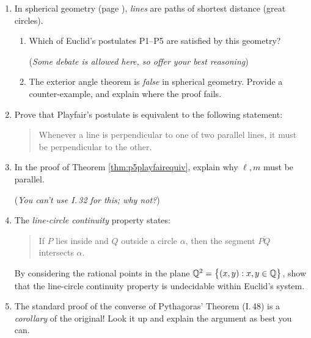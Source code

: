 \begin{exercises}
\begin{enumerate}
	  
	  \item In spherical geometry (page \pageref{pg:sphere}), \emph{lines} are paths of shortest distance (great circles).
	 	\begin{enumerate}
	 	  \item Which of Euclid's postulates P1--P5 are satisfied by this geometry?\par
	 	  (\emph{Some debate is allowed here, so offer your best reasoning})
	 	  
	  	\item The exterior angle theorem is \emph{false} in spherical geometry. Provide a counter-example, and explain where the proof fails. 
	 	\end{enumerate}
	  
	  
	  \item Prove that Playfair's postulate is equivalent to the following statement:
	 	\begin{quote}
	  	Whenever a line is perpendicular to one of two parallel lines, it must be perpendicular to the other.
	  \end{quote}
	  
	  
	  \item\label{exs:playfairlparallellemma} In the proof of Theorem \ref{thm:p5playfairequiv}, explain why $\ell,m$ must be parallel.\par
	  (\emph{You can't use I.\,32 for this; why not?})
	 
	 
	 	\pagebreak[3]
	 
 
	  \item\label{ex:euclidundecideable} The \emph{line-circle continuity} property states:
	  \begin{quote}
	  	If $P$ lies inside and $Q$ outside a circle $\alpha$, then the segment $\overline{PQ}$ intersects $\alpha$.
	  \end{quote}
	  By considering the rational points in the plane $\mathbb{Q}^2=\big\{(x,y):x,y\in\mathbb{Q}\big\}$, show that the line-circle continuity property is undecidable within Euclid's system.
		
		
		\item The standard proof of the converse of Pythagoras' Theorem (I.\,48) is a \emph{corollary} of the original! Look it up and explain the argument as best you can.
	\end{enumerate}
	
\end{exercises}

\clearpage



